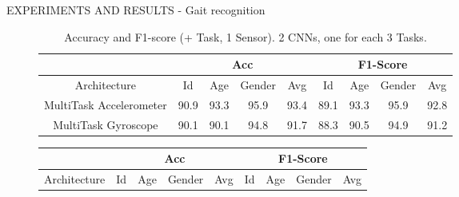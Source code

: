 \begin{frame}{EXPERIMENTS AND RESULTS - Gait recognition}
\begin{minipage}{\linewidth}
\begin{minipage}{0.45\linewidth}
\begin{table}[h!]
\begin{adjustbox}{max width=\textwidth}
                \end{adjustbox}
                \caption{Accuracy and F1-score (1 Task, + Sensor). 1 CNN for each Task.}
                \label{table accuracy and F1 (1 Task, + Sensor)}
            \end{table}
        \end{minipage}
        \hspace{0.05\linewidth}
        \begin{minipage}{0.45\linewidth}
            \begin{figure}[htbp]
                \centering
                \begin{table}[h!]
                    \centering
                    \begin{adjustbox}{max width=\textwidth}
                    \begin{tabular}{|c||ccc|c||ccc|c|}
                        \hline
                            & \multicolumn{4}{c||}{Acc} & \multicolumn{4}{c|}{F1-Score} \\
                        \hline
                            Architecture & Id & Age & Gender & Avg & Id & Age & Gender & Avg\\
                        \hline
                            MultiTask Accelerometer & 90.9 & 93.3 & 95.9 & 93.4 & 89.1 & 93.3 & 95.9 & 92.8\\
                            MultiTask Gyroscope & 90.1 & 90.1 & 94.8 & 91.7 & 88.3 & 90.5 & 94.9 & 91.2\\
                        \hline 
                    \end{tabular}
                    \end{adjustbox}
                    \caption{Accuracy and F1-score (+ Task, 1 Sensor). 2 CNNs, one for each 3 Tasks.}
                    \label{table accuracy and F1 (more Task - 1 Sensor)}
                \end{table}
                \centering
                \begin{table}[h!]
                    \centering
                    \begin{adjustbox}{max width=\textwidth}
                    \begin{tabular}{|c||ccc|c||ccc|c|}
                        \hline
                            & \multicolumn{4}{c||}{Acc} & \multicolumn{4}{c|}{F1-Score} \\
                        \hline
                            Architecture & Id & Age & Gender & Avg & Id & Age & Gender & Avg\\

\end{tabular}
\end{adjustbox}
\end{table}
\end{figure}
\end{minipage}
\end{minipage}
\end{frame}
